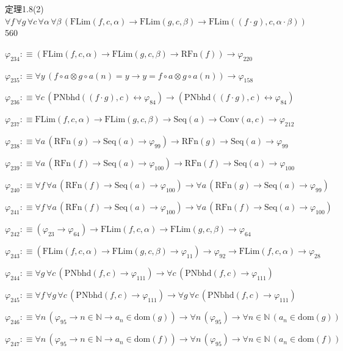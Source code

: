 \begin{fullproof}{定理1.8(2)}{$\forall f\,\forall g\,\forall c\,\forall \alpha\,\forall \beta\,(\mathrm{FLim}(f,c,\alpha) \to \mathrm{FLim}(g,c,\beta) \to \mathrm{FLim}((f \cdot g),c,\alpha \cdot \beta))$}{560}
\begin{abbrevlist}
\item $\varphi_{234} :\equiv (\mathrm{FLim}(f,c,\alpha) \to \mathrm{FLim}(g,c,\beta) \to \mathrm{RFn}(f)) \to \varphi_{220}$
\item $\varphi_{235} :\equiv \forall y\,(f \circ a \otimes g \circ a(n) = y \to y = f \circ a \otimes g \circ a(n)) \to \varphi_{158}$
\item $\varphi_{236} :\equiv \forall c\,(\mathrm{PNbhd}((f \cdot g),c) \leftrightarrow \varphi_{84}) \to (\mathrm{PNbhd}((f \cdot g),c) \leftrightarrow \varphi_{84})$
\item $\varphi_{237} :\equiv \mathrm{FLim}(f,c,\alpha) \to \mathrm{FLim}(g,c,\beta) \to \mathrm{Seq}(a) \to \mathrm{Conv}(a,c) \to \varphi_{212}$
\item $\varphi_{238} :\equiv \forall a\,(\mathrm{RFn}(g) \to \mathrm{Seq}(a) \to \varphi_{99}) \to \mathrm{RFn}(g) \to \mathrm{Seq}(a) \to \varphi_{99}$
\item $\varphi_{239} :\equiv \forall a\,(\mathrm{RFn}(f) \to \mathrm{Seq}(a) \to \varphi_{100}) \to \mathrm{RFn}(f) \to \mathrm{Seq}(a) \to \varphi_{100}$
\item $\varphi_{240} :\equiv \forall f\,\forall a\,(\mathrm{RFn}(f) \to \mathrm{Seq}(a) \to \varphi_{100}) \to \forall a\,(\mathrm{RFn}(g) \to \mathrm{Seq}(a) \to \varphi_{99})$
\item $\varphi_{241} :\equiv \forall f\,\forall a\,(\mathrm{RFn}(f) \to \mathrm{Seq}(a) \to \varphi_{100}) \to \forall a\,(\mathrm{RFn}(f) \to \mathrm{Seq}(a) \to \varphi_{100})$
\item $\varphi_{242} :\equiv (\varphi_{23} \to \varphi_{64}) \to \mathrm{FLim}(f,c,\alpha) \to \mathrm{FLim}(g,c,\beta) \to \varphi_{64}$
\item $\varphi_{243} :\equiv (\mathrm{FLim}(f,c,\alpha) \to \mathrm{FLim}(g,c,\beta) \to \varphi_{11}) \to \varphi_{92} \to \mathrm{FLim}(f,c,\alpha) \to \varphi_{28}$
\item $\varphi_{244} :\equiv \forall g\,\forall c\,(\mathrm{PNbhd}(f,c) \to \varphi_{111}) \to \forall c\,(\mathrm{PNbhd}(f,c) \to \varphi_{111})$
\item $\varphi_{245} :\equiv \forall f\,\forall g\,\forall c\,(\mathrm{PNbhd}(f,c) \to \varphi_{111}) \to \forall g\,\forall c\,(\mathrm{PNbhd}(f,c) \to \varphi_{111})$
\item $\varphi_{246} :\equiv \forall n\,(\varphi_{95} \to n \in \mathbb{N} \to a_{n} \in \mathrm{dom}(g)) \to \forall n\,(\varphi_{95}) \to \forall n \in \mathbb{N}\,(a_{n} \in \mathrm{dom}(g))$
\item $\varphi_{247} :\equiv \forall n\,(\varphi_{95} \to n \in \mathbb{N} \to a_{n} \in \mathrm{dom}(f)) \to \forall n\,(\varphi_{95}) \to \forall n \in \mathbb{N}\,(a_{n} \in \mathrm{dom}(f))$

\end{abbrevlist}
\end{fullproof}
